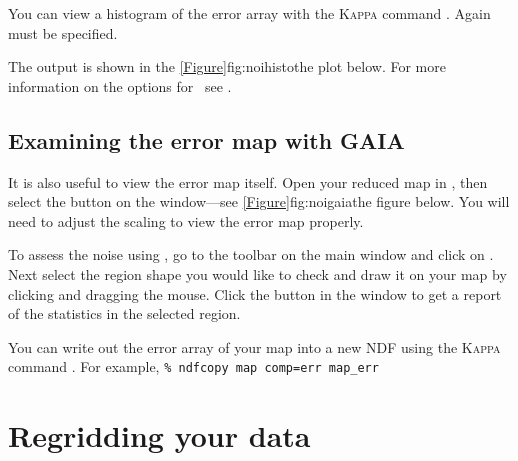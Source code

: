 You can view a histogram of the error array with the
\textsc{Kappa} command \histogram. Again  must be
specified.

\begin{terminalv}
\end{terminalv}
The output is shown in the \cref{Figure}{fig:noihisto}{the plot below}.
For more information on the options for \histogram\ see
\kappasun.


\subsection{Examining the error map with GAIA}

It is also useful to view the error map itself. Open your reduced map
in \gaia, then select the  button on the
 window---see
\cref{Figure}{fig:noigaia}{the figure below}. You will need to adjust
the scaling to view the error map properly.

To assess the noise using \gaia, go to the toolbar on the main window
and click on . Next select the region shape you would like to check and
draw it on your map by clicking and dragging the mouse. Click the
 button in the 
window to get a report of the statistics in the selected region.

\begin{tip}
  You can write out the error array of your map into a new NDF using
  the \textsc{Kappa} command \ndfcopy. For example, \texttt{\% ndfcopy
    map comp=err map\_err}
\end{tip}





\section{Regridding your data}
\label{sec:regriddata}

